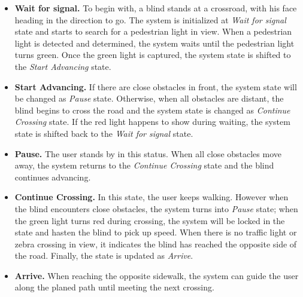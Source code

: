 \begin{itemize}
\item \textbf{Wait for signal.} To begin with, a blind stands at a crossroad, with his face heading in the direction to go. The system is initialized at \emph{Wait for signal} state and starts to search for a pedestrian light in view. When a pedestrian light is detected and determined, the system waits until the pedestrian light turns green. Once the green light is captured, the system state is shifted to the \emph{Start Advancing} state.

\item \textbf{Start Advancing.} 
If there are close obstacles in front, the system state will be changed as \emph{Pause} state. Otherwise, when all obstacles are distant, the blind begins to cross the road and the system state is changed as \emph{Continue Crossing} state. If the red light happens to show during waiting, the system state is shifted back to the \emph{Wait for signal} state. 


\item \textbf{Pause.} The user stands by in this status. When all close obstacles move away, the system returns to the \emph{Continue Crossing} state and the blind continues advancing. 


\item \textbf{Continue Crossing.} In this state, the user keeps walking. However when the blind encounters close obstacles, the system turns into \emph{Pause} state; when  the green light turns red during crossing, the system will be locked in the state and hasten the blind to pick up speed. When there is no traffic light or zebra crossing in view, it indicates the blind has reached the opposite side of the road. Finally, the state is updated as \emph{Arrive}.


\item \textbf{Arrive.} When reaching the opposite sidewalk, the system can guide the user along the planed path until meeting the next crossing. 
\end{itemize}



